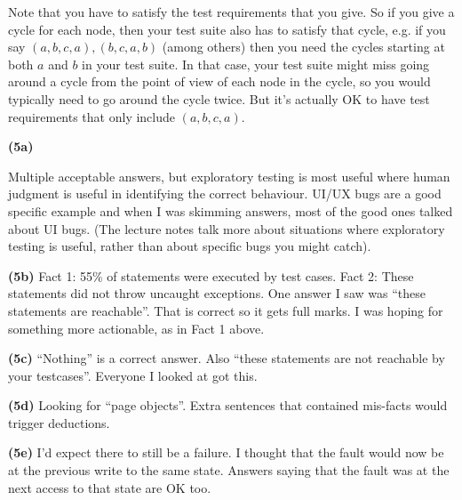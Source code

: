 \documentclass[11pt,onecolumn,letterpaper]{article}
\newcounter{qNum}
\newcommand{\q}[1]{%
\textbf{(#1)}\stepcounter{qNum}}
\begin{document}
Note that you have to satisfy the test requirements that you give. So
if you give a cycle for each node, then your test suite also has to
satisfy that cycle, e.g. if you say $(a, b, c, a), (b, c, a, b)$
(among others) then you need the cycles starting at both $a$ and $b$
in your test suite.  In that case, your test suite might miss going
around a cycle from the point of view of each node in the cycle, so
you would typically need to go around the cycle twice. But it's
actually OK to have test requirements that only include $(a, b, c,
a)$.

\q{5a}

Multiple acceptable answers, but exploratory testing is most useful
where human judgment is useful in identifying the correct
behaviour. UI/UX bugs are a good specific example and when I was
skimming answers, most of the good ones talked about UI bugs.  (The
lecture notes talk more about situations where exploratory testing is
useful, rather than about specific bugs you might catch).

\q{5b}
Fact 1: 55\% of statements were executed by test cases. Fact 2: These statements
did not throw uncaught exceptions.
One answer I saw was ``these statements are reachable''. That is correct so it
gets full marks. I was hoping for something more actionable, as in Fact 1 above.

\q{5c}
``Nothing'' is a correct answer. Also ``these statements are not reachable by your testcases''. Everyone I looked at got this.

\q{5d}
Looking for ``page objects''. Extra sentences that contained mis-facts would trigger deductions.

\q{5e}
I'd expect there to still be a failure. I thought that the fault would now be at the previous
write to the same state. Answers saying that the fault was at the next access to that
state are OK too.




  
  
    
\end{document}
